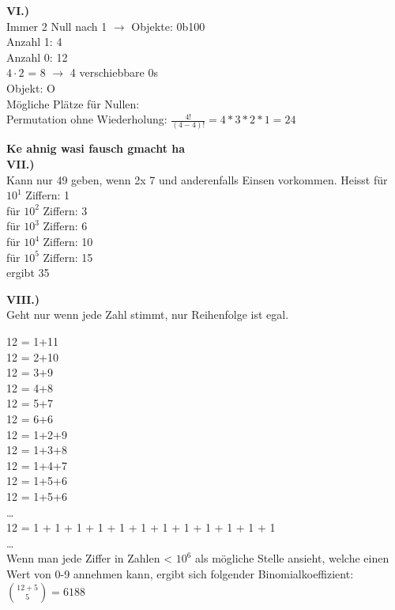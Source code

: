 \documentclass[12pt]{scrartcl}
\begin{document}
\textbf{VI.)}\\
Immer 2 Null nach 1 $\rightarrow$ Objekte: 0b100\\
Anzahl 1: 4\\
Anzahl 0: 12\\

$4 \cdot 2$ = 8 $\rightarrow$ 4 verschiebbare 0s\\

Objekt: O\\

Mögliche Plätze für Nullen: \\

Permutation ohne Wiederholung:
$\frac{4!}{(4-4)!} = 4*3*2*1 = 24$

\textbf{Ke ahnig wasi fausch gmacht ha}\\


\textbf{VII.)}\\
Kann nur 49 geben, wenn 2x 7 und anderenfalls Einsen vorkommen.
Heisst für $10^1$ Ziffern: 1\\
für $10^2$ Ziffern: 3\\
für $10^3$ Ziffern: 6\\
für $10^4$ Ziffern: 10\\
für $10^5$ Ziffern: 15\\

ergibt 35


\textbf{VIII.)}\\
Geht nur wenn jede Zahl stimmt, nur Reihenfolge ist egal.


12 = 1+11\\
12 = 2+10\\
12 = 3+9\\
12 = 4+8\\
12 = 5+7\\
12 = 6+6\\
12 = 1+2+9\\
12 = 1+3+8\\
12 = 1+4+7\\
12 = 1+5+6\\
12 = 1+5+6\\
\dots\\
12 = 1 + 1 + 1 + 1 + 1 + 1 + 1 + 1 + 1 + 1 + 1 + 1\\
\dots\\

Wenn man jede Ziffer in Zahlen < $10^6$ als mögliche Stelle ansieht, welche einen
Wert von 0-9 annehmen kann, ergibt sich folgender Binomialkoeffizient:\\
$\binom{12+5}{5} = 6188$\\
\end{document}
